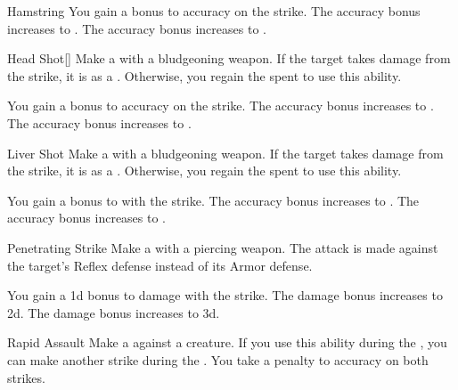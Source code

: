 {\begin{apability}{Hamstring}
                \rankline
                 You gain a  bonus to accuracy on the strike.
                 The accuracy bonus increases to .
                 The accuracy bonus increases to .
            \end{apability}

            \begin{apability}{Head Shot}[]
                Make a  with a bludgeoning weapon.
                If the target takes damage from the strike, it is  as a .
                Otherwise, you regain the  spent to use this ability.

                \rankline
                 You gain a  bonus to accuracy on the strike.
                 The accuracy bonus increases to .
                 The accuracy bonus increases to .
            \end{apability}

            \begin{apability}{Liver Shot}
                Make a  with a bludgeoning weapon.
                If the target takes damage from the strike, it is \sickened as a .
                Otherwise, you regain the  spent to use this ability.

                \rankline
                 You gain a  bonus to  with the strike.
                 The accuracy bonus increases to .
                 The accuracy bonus increases to .
            \end{apability}

            \begin{apability}{Penetrating Strike}
                Make a  with a piercing weapon.
                The attack is made against the target's Reflex defense instead of its Armor defense.

                \rankline
                 You gain a \plus1d bonus to damage with the strike.
                 The damage bonus increases to \plus2d.
                 The damage bonus increases to \plus3d.
            \end{apability}

            \begin{apability}{Rapid Assault}
                Make a  against a creature.
                If you use this ability during the , you can make another strike during the .
                You take a  penalty to accuracy on both strikes.


\end{apability}}
